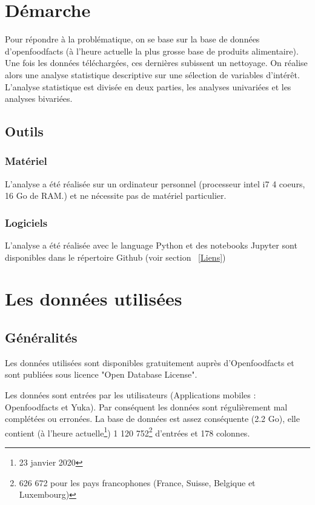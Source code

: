 \section{Démarche}

  Pour répondre à la problématique, on se base sur la base de données
  d'openfoodfacts (à l'heure actuelle la plus grosse base de produits alimentaire).
  Une fois les données téléchargées, ces dernières subissent un nettoyage.
  On réalise alors une analyse statistique descriptive
  sur une sélection de variables d'intérêt.
  L'analyse statistique est divisée en deux parties, les analyses univariées et
  les analyses bivariées.

  \subsection{Outils}

    \subsubsection{Matériel}

    L'analyse a été réalisée sur un ordinateur personnel
    (processeur intel i7 4 coeurs, 16 Go de RAM.) et ne nécessite pas de
    matériel particulier.

    \subsubsection{Logiciels}

    L'analyse a été réalisée avec le language Python et des notebooks Jupyter
    sont disponibles dans le répertoire Github (voir section ~\ref{Liens})

\section{Les données utilisées}

  \subsection{Généralités}

  Les données utilisées sont disponibles gratuitement auprès d'Openfoodfacts et
  sont publiées sous licence "Open Database License".

  Les données sont entrées par les utilisateurs (Applications mobiles :
  Openfoodfacts et Yuka). Par conséquent les données sont régulièrement mal
  complétées ou erronées.
  La base de données est assez conséquente (2.2 Go), elle contient (à l'heure
  actuelle\footnote{23 janvier 2020}) 1 120 752\footnote{626 672 pour les pays
  francophones (France, Suisse, Belgique et Luxembourg)} d'entrées et 178 colonnes.

